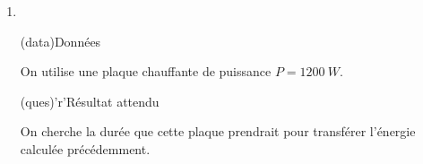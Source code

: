 \documentclass[../main/main.tex]{subfiles}
\begin{document}
{\begin{enumerate}
\begin{tcbraster}[raster columns=2, raster equal height=rows]
\begin{tcolorbox}[blankest, raster multicolumn=1, space to=\myspace]
\begin{tcbraster}[raster columns=1]
\begin{tcb}[add to natural height=\myspace]
{						      attendu}
						      On cherche à monter \SI{1}{L} d'eau de 20 à
						      \SI{100}{\degreeCelsius} et d'en calculer le coût en
						      euros.
					      \end{tcb}
					      \begin{tcb}(tool)'r'{Outil}
						      On doit donc trouver le coût en énergie et le convertir
						      en euro. On cherche pour ça une loi reliant l'énergie
						      consommée avec les données du problème, sachant que
						      \textbf{pour l'eau}, \SI{1}{L} = \SI{1}{kg}.
					      \end{tcb}
				      \end{tcbraster}
			      \end{tcolorbox}
		      \end{tcbraster}
		      \begin{tcb}(appl){Application}
			      L'énergie à apporter $Q$ se déduit de la dimension de la capacité
			      thermique massique~: $\dim{c} = \dim{Q}\rm\cdot M^{-1}\cdot
				      \Theta^{-1}$. En appelant $m$ la masse du volume d'eau, par cette
			      analyse dimensionnelle on a
			      \[\boxed{Q = mc\Delta T}\]
			      On a donc
			      \[Q = \SI{3.3e5}{J}\quad\text{avec}\quad \left\{
				      \begin{array}{rcl}
					      m        & = & \SI{1}{kg}                    \\
					      c        & = & \SI{4.18}{J.g^{-1}.K^{-1}}    \\\Lra
					      c        & = & \SI{4.18e3}{J.kg^{-1}.K^{-1}} \\
					      \Delta T & = & \SI{80}{K}
				      \end{array}
				      \right.\]
			      et pour utiliser le coût en euros, on la converti en \si{kWh}~:
			      \[\xul{Q = \SI{9.3e-2}{kWh} = \SI{1.5e-2}{\EUR}}\]
		      \end{tcb}
		\item ~
		      \begin{tcbraster}[raster columns=2, raster equal height=rows]
			      \begin{tcb}(data){Données}

				      On utilise une plaque chauffante de puissance $P =
					      \SI{1200}{W}$.

			      \end{tcb}
			      \begin{tcb}(ques)'r'{Résultat attendu}

				      On cherche la durée que cette plaque prendrait pour
				      transférer l'énergie calculée précédemment.


\end{tcb}
\end{tcbraster}
\end{enumerate}}
\end{document}
